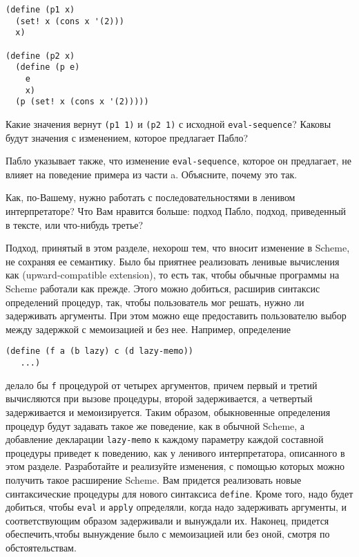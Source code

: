 \begin{exercise}{4.30}
\begin{plainenum}
\begin{Verbatim}[fontsize=\small]
(define (p1 x)
  (set! x (cons x '(2)))
  x)

(define (p2 x)
  (define (p e)
    e
    x)
  (p (set! x (cons x '(2)))))
\end{Verbatim}
Какие значения вернут {\tt (p1 1)} и {\tt (p2 1)} с
исходной {\tt eval-sequence}?  Каковы будут значения с
изменением, которое предлагает Пабло?

\item
 Пабло указывает также, что изменение
{\tt eval-sequence}, которое он предлагает, не влияет на
поведение примера из части a.  Объясните, почему это так.

\item
Как, по-Вашему, нужно работать с
последовательностями в ленивом интерпретаторе? Что Вам нравится
больше: подход Пабло, подход, приведенный в тексте, или что-нибудь
третье?
\end{plainenum}
\end{exercise}

\begin{exercise}{4.31}%
\label{EX4.31}%
Подход, принятый в этом разделе, нехорош тем, что
вносит изменение в Scheme, не сохраняя ее семантику.  Было бы
приятнее реализовать ленивые вычисления как 
 (upward-compatible extension),
то есть так, чтобы обычные программы на Scheme работали как прежде.
Этого можно добиться, расширив синтаксис определений процедур, так,
чтобы пользователь мог решать, нужно ли задерживать аргументы.  При
этом можно еще предоставить пользователю выбор между задержкой с мемоизацией и
без нее.  Например, определение

\begin{Verbatim}[fontsize=\small]
(define (f a (b lazy) c (d lazy-memo))
   ...)
\end{Verbatim}
делало бы {\tt f} процедурой от четырех аргументов, причем
первый и третий вычисляются при вызове процедуры, второй
задерживается, а четвертый задерживается и мемоизируется.  Таким
образом, обыкновенные определения процедур будут задавать такое же
поведение, как в обычной Scheme, а добавление декларации
{\tt lazy-memo} к каждому параметру каждой составной процедуры
приведет к поведению, как у ленивого интерпретатора, описанного в этом
разделе.  Разработайте и реализуйте изменения, с помощью которых можно
получить такое расширение Scheme.  Вам придется реализовать новые
синтаксические процедуры для нового синтаксиса {\tt define}.
Кроме того, надо будет добиться, чтобы {\tt eval} и
{\tt apply} определяли, когда надо задерживать аргументы, и
соответствующим образом задерживали и вынуждали их.
Наконец, придется обеспечить,чтобы вынуждение было с
мемоизацией или без оной, смотря по обстоятельствам.
\end{exercise}

